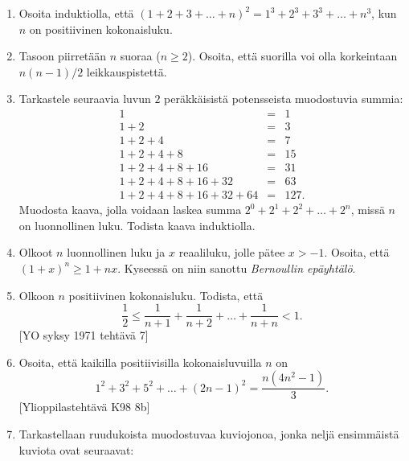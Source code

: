 \begin{enumerate}
\item Osoita induktiolla, että $(1 + 2 + 3 +\ldots + n)^2 = 1^3 + 2^3 + 3^3 + \ldots + n^3$, kun $n$ on positiivinen kokonaisluku.

\item Tasoon piirretään $n$ suoraa ($n\ge 2$). Osoita, että suorilla voi olla korkeintaan $n(n - 1)/2$ leikkauspistettä.

\item Tarkastele seuraavia luvun $2$ peräkkäisistä potensseista muodostuvia summia:
\[
\begin{array}{rcl}
1 &=& 1\\
1 + 2 &=& 3\\
1 + 2 + 4 &=& 7\\
1 + 2 + 4 + 8 &=& 15\\
1 + 2 + 4 + 8 + 16 &=& 31\\
1 + 2 + 4 + 8 + 16 + 32 &=& 63\\
1 + 2 + 4 + 8 + 16 + 32 + 64 &=& 127.
\end{array}
\]
Muodosta kaava, jolla voidaan laskea summa $2^0 + 2^1 + 2^2 + \ldots + 2^n$, missä $n$ on luonnollinen luku. Todista kaava induktiolla.

\item Olkoot $n$ luonnollinen luku ja $x$ reaaliluku, jolle pätee $x > -1$. Osoita, että $(1 + x)^n \ge 1 + nx$. Kyseessä on niin sanottu {\em Bernoullin epäyhtälö}.

\item Olkoon $n$ positiivinen kokonaisluku. Todista, että
\[
\frac{1}{2}\le\frac{1}{n+1}+\frac{1}{n+2}+\ldots +\frac{1}{n+n} <1.
\]
[YO syksy 1971 tehtävä 7]


\item
Osoita, että kaikilla positiivisilla kokonaisluvuilla $n$ on
\[
1^2+3^2+5^2+\ldots+(2n-1)^2 = \frac{n(4n^2-1)}{3}. 
\]
[Ylioppilastehtävä K98 8b]

\item Tarkastellaan ruudukoista muodostuvaa kuviojonoa, jonka neljä ensimmäistä kuviota ovat seuraavat:


\end{enumerate}
